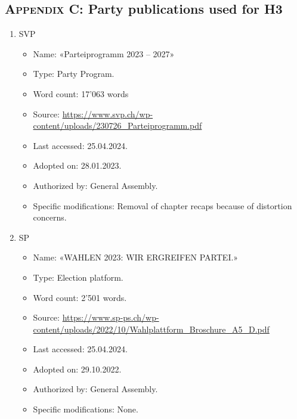 \documentclass[11pt,a4paper]{article}
\begin{document}
\newpage
\subsection*{\textsc{Appendix C}: Party publications used for H3 }

\begin{enumerate}
    \item SVP
    \begin{itemize}
        \item Name: «Parteiprogramm 2023 – 2027»
        \item Type: Party Program.
        \item Word count: 17’063 words
        \item Source: \href{https://www.svp.ch/wp-content/uploads/230726_Parteiprogramm.pdf}{https://www.svp.ch/wp-content/uploads/230726\_Parteiprogramm.pdf}
        \item Last accessed: 25.04.2024.
        \item Adopted on: 28.01.2023.
        \item Authorized by: General Assembly.
        \item Specific modifications: Removal of chapter recaps because of distortion concerns.
    \end{itemize}
\item SP
    \begin{itemize}
        \item Name: «WAHLEN 2023: WIR ERGREIFEN PARTEI.»
        \item Type: Election platform.
        \item Word count: 2’501 words.
        \item Source: \href{https://www.sp-ps.ch/wp-content/uploads/2022/10/Wahlplattform_Broschure_A5_D.pdf}{https://www.sp-ps.ch/wp-content/uploads/2022/10/Wahlplattform\_Broschure\_A5\_D.pdf}
        \item Last accessed: 25.04.2024.
        \item Adopted on: 29.10.2022.
        \item Authorized by: General Assembly.
        \item Specific modifications: None.
    \end{itemize}


\end{enumerate}
\end{document}
